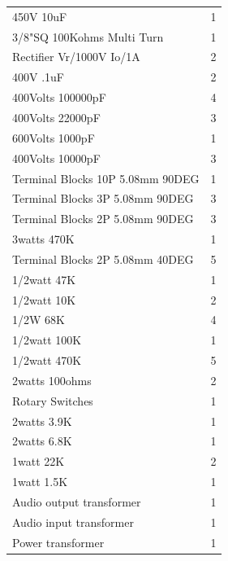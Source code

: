 \documentclass[journal]{IEEEtran}
\begin{document}
\begin{table}[]
\begin{tabular}{l|l}
			450V 10uF                             & 1          \\
			3/8"SQ 100Kohms Multi Turn            & 1          \\
			Rectifier Vr/1000V Io/1A              & 2          \\
			400V .1uF                             & 2          \\
			400Volts 100000pF                     & 4          \\
			400Volts 22000pF                      & 3          \\
			600Volts 1000pF                       & 1          \\
			400Volts 10000pF                      & 3          \\
			Terminal Blocks 10P 5.08mm 90DEG      & 1          \\
			Terminal Blocks 3P 5.08mm 90DEG       & 3          \\
			Terminal Blocks 2P 5.08mm 90DEG       & 3          \\
			3watts 470K                           & 1          \\
			Terminal Blocks 2P 5.08mm 40DEG       & 5          \\
			1/2watt 47K                           & 1          \\
			1/2watt 10K                           & 2          \\
			1/2W 68K                              & 4          \\
			1/2watt 100K                          & 1          \\
			1/2watt 470K                          & 5          \\
			2watts 100ohms                        & 2          \\
			Rotary Switches                       & 1          \\
			2watts 3.9K                           & 1          \\
			2watts 6.8K                           & 1          \\
			1watt 22K                             & 2          \\
			1watt 1.5K                            & 1          \\
			Audio output transformer              & 1          \\
			Audio input transformer               & 1          \\
			Power transformer                     & 1          \\

\end{tabular}
\end{table}
\end{document}
